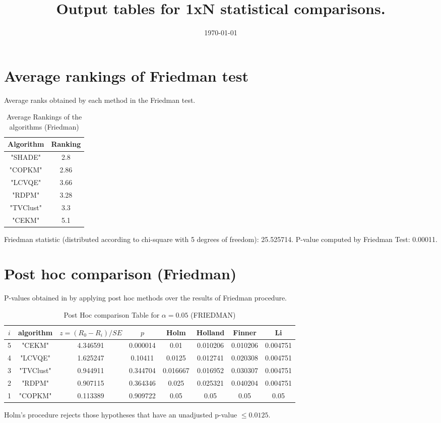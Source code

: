 \documentclass[a4paper,10pt]{article}
\title{Output tables for 1xN statistical comparisons.}
\author{}
\date{\today}
\begin{document}
\pagestyle{empty}
\maketitle
\thispagestyle{empty}

\section{Average rankings of Friedman test}


Average ranks obtained by each method in the Friedman test.

\begin{table}[!htp]
\centering
\begin{tabular}{|c|c|}\hline
Algorithm&Ranking\\\hline
"SHADE"&2.8\\"COPKM"&2.86\\"LCVQE"&3.66\\"RDPM"&3.28\\"TVClust"&3.3\\"CEKM"&5.1\\\hline\end{tabular}
\caption{Average Rankings of the algorithms (Friedman)}
\end{table}

Friedman statistic (distributed according to chi-square with 5 degrees of freedom): 25.525714. \newline P-value computed by Friedman Test: 0.00011.\newline


\newpage

\section{Post hoc comparison (Friedman)}


P-values obtained in by applying post hoc methods over the results of Friedman procedure.

\begin{table}[!htp]
\centering\footnotesize
\begin{tabular}{cccccccc}
$i$&algorithm&$z=(R_0 - R_i)/SE$&$p$&Holm &Holland&Finner&Li\\
\hline5&"CEKM"&4.346591&0.000014&0.01&0.010206&0.010206&0.004751\\4&"LCVQE"&1.625247&0.10411&0.0125&0.012741&0.020308&0.004751\\3&"TVClust"&0.944911&0.344704&0.016667&0.016952&0.030307&0.004751\\2&"RDPM"&0.907115&0.364346&0.025&0.025321&0.040204&0.004751\\1&"COPKM"&0.113389&0.909722&0.05&0.05&0.05&0.05\\\hline
\end{tabular}
\caption{Post Hoc comparison Table for $\alpha=0.05$ (FRIEDMAN)}
\end{table}Holm's procedure rejects those hypotheses that have an unadjusted p-value $\le0.0125$.
\end{document}
